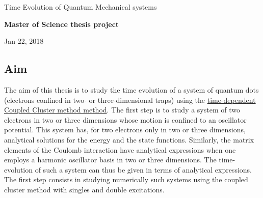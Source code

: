 \documentclass[%
oneside,                 %
final,                   %
10pt]{article}
\begin{document}

\newcommand{\exercisesection}[1]{\subsection*{#1}}






\thispagestyle{empty}

\begin{center}
{\LARGE\bf
\begin{spacing}{1.25}
Time Evolution of Quantum Mechanical systems
\end{spacing}
}
\end{center}


\begin{center}
{\bf Master of Science thesis project${}^{}$} \\ [0mm]
\end{center}

\begin{center}
\end{center}
    

\begin{center}
Jan 22, 2018
\end{center}

\vspace{1cm}


\subsection{Aim}

The aim of this thesis is to study the time evolution of a system of
quantum dots (electrons confined in two- or three-dimensional traps) using the
\href{{https://github.com/haakoek/PythonVersionMaster/tree/master/Thesis/Chapters}}{time-dependent Coupled Cluster method
method}. The
first step is to study a system of two electrons in two or three
dimensions whose motion is confined to an oscillator potential. This
system has, for two electrons only in two or three dimensions,
analytical solutions for the energy and the state
functions. Similarly, the matrix elements of the Coulomb interaction
have analytical expressions when one employs a harmonic oscillator
basis in two or three dimensions. The time-evolution of such a system
can thus be given in terms of analytical expressions. The first step
consists in studying numerically such systems using the coupled
cluster method with singles and double excitations.  
\end{document}
